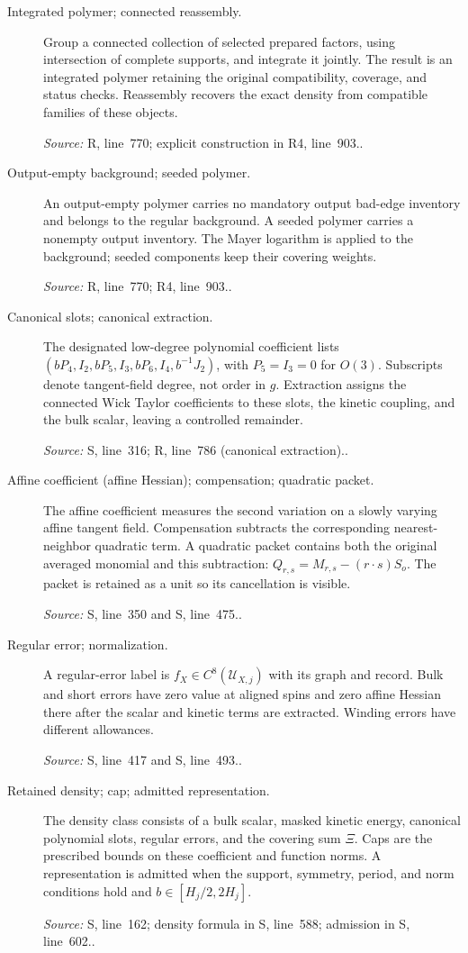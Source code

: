 \documentclass[11pt]{article}
\newcommand{\src}[2]{\textsf{#1}, line~#2}
\newcommand{\where}[1]{\par{\small\textit{Source:} #1.}}
\begin{document}
\begin{description}
\item[Integrated polymer; connected reassembly.]
Group a connected collection of selected prepared factors, using
intersection of complete supports, and integrate it jointly.  The
result is an integrated polymer retaining the original compatibility,
coverage, and status checks.  Reassembly recovers the exact density
from compatible families of these objects.
\where{\src{R}{770}; explicit construction in \src{R4}{903}.}

\item[Output-empty background; seeded polymer.]
An output-empty polymer carries no mandatory output bad-edge inventory
and belongs to the regular background.  A seeded polymer carries a
nonempty output inventory.  The Mayer logarithm is applied to the
background; seeded components keep their covering weights.
\where{\src{R}{770}; \src{R4}{903}.}

\item[Canonical slots; canonical extraction.]
The designated low-degree polynomial coefficient lists
\((bP_4,I_2,bP_5,I_3,bP_6,I_4,b^{-1}J_2)\), with
\(P_5=I_3=0\) for \(O(3)\).  Subscripts denote tangent-field
degree, not order in \(g\).  Extraction assigns the connected Wick
Taylor coefficients to these slots, the kinetic coupling, and the
bulk scalar, leaving a controlled remainder.
\where{\src{S}{316}; \src{R}{786} (canonical extraction).}

\item[Affine coefficient (affine Hessian); compensation; quadratic packet.]
The affine coefficient measures the second variation on a slowly
varying affine tangent field.  Compensation subtracts the corresponding
nearest-neighbor quadratic term.  A quadratic packet contains both
the original averaged monomial and this subtraction:
\(Q_{r,s}=M_{r,s}-(r\cdot s)S_o\).
The packet is retained as a unit so its cancellation is visible.
\where{\src{S}{350} and \src{S}{475}.}

\item[Regular error; normalization.]
A regular-error label is \(f_X\in C^8(\mathcal U_{X,j})\) with its
graph and record.  Bulk and short errors have zero value at aligned
spins and zero affine Hessian there after the scalar and kinetic terms
are extracted.  Winding errors have different allowances.
\where{\src{S}{417} and \src{S}{493}.}

\item[Retained density; cap; admitted representation.]
The density class consists of a bulk scalar, masked kinetic energy,
canonical polynomial slots, regular errors, and the covering sum
\(\Xi\).  Caps are the prescribed bounds on these coefficient and
function norms.  A representation is admitted when the support,
symmetry, period, and norm conditions hold and
\(b\in[H_j/2,2H_j]\).
\where{\src{S}{162}; density formula in \src{S}{588};
admission in \src{S}{602}.}


\end{description}
\end{document}
